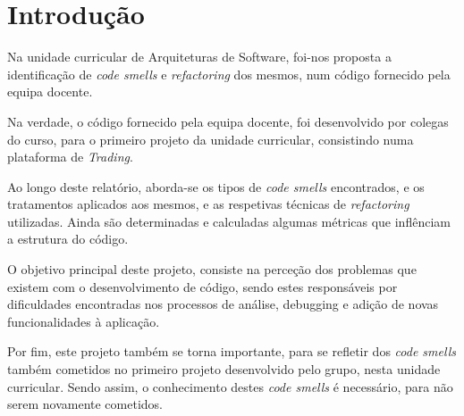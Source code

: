 \chapter{Introdução}

\hspace{5mm} Na unidade curricular de Arquiteturas de Software, foi-nos proposta a identificação de \emph{code smells} e \emph{refactoring} dos mesmos, num código fornecido pela equipa docente.

\hspace{5mm} Na verdade, o código fornecido pela equipa docente, foi desenvolvido por colegas do curso, para o primeiro projeto da unidade curricular, consistindo numa plataforma de \emph{Trading}.

\hspace{5mm} Ao longo deste relatório, aborda-se os tipos de \emph{code smells} encontrados, e os tratamentos aplicados aos mesmos, e as respetivas técnicas de \emph{refactoring} utilizadas. Ainda são determinadas e calculadas algumas métricas que inflênciam a estrutura do código.

\hspace{5mm} O objetivo principal deste projeto, consiste na perceção dos problemas que existem com o desenvolvimento de código, sendo estes responsáveis por dificuldades encontradas nos processos de análise, debugging e adição de novas funcionalidades à aplicação.

\hspace{5mm} Por fim, este projeto também se torna importante, para se refletir dos \emph{code smells} também cometidos no primeiro projeto desenvolvido pelo grupo, nesta unidade curricular. Sendo assim, o conhecimento destes \emph{code smells} é necessário, para não serem novamente cometidos.